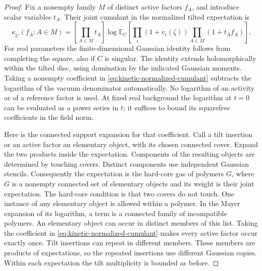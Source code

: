 \documentclass[11pt]{article}
\theoremstyle{definition}
\newcommand{\E}{\mathbb E}
\begin{document}
\begin{proof}
Fix a nonempty family \(M\) of distinct active factors
\(f_A\), and introduce scalar variables \(t_A\). Their joint
cumulant in the normalized tilted expectation is
\begin{equation}
 \kappa_{\widetilde C}(f_A:A\in M)
   =\left[\prod_{A\in M}t_A\right]
       \log\E_C\left[
         \prod_i(1+v_i(\zeta))
         \prod_{A\in M}(1+t_A f_A)
       \right].
 \label{eq:kinetic-normalized-cumulant}
\end{equation}
For real parameters the finite-dimensional Gaussian
identity follows from completing the square, also if
\(C\) is singular. The identity extends holomorphically
within the tilted disc, using domination by the indicated
Gaussian moments. Taking a nonempty coefficient in
\eqref{eq:kinetic-normalized-cumulant} subtracts the
logarithm of the vacuum denominator automatically.
No logarithm of an activity or of a reference factor is
used. At fixed real background the logarithm at \(t=0\)
can be evaluated as a power series in \(t\); it suffices
to bound its squarefree coefficients in the field norm.

Here is the connected support expansion for that coefficient.
Call a tilt insertion or an active factor an elementary
object, with its chosen connected cover. Expand the two
products inside the expectation. Components of the resulting
objects are determined by touching covers. Distinct
components use independent Gaussian stencils. Consequently
the expectation is the hard-core gas of polymers \(G\),
where \(G\) is a nonempty connected set of elementary objects
and its weight is their joint expectation. The hard-core
condition is that two covers do not touch. One instance
of any elementary object is allowed within a polymer.
In the Mayer expansion of its logarithm, a term is a
connected family of incompatible polymers. An elementary
object can occur in distinct members of this list. Taking
the coefficient in \eqref{eq:kinetic-normalized-cumulant}
makes every active factor occur exactly once. Tilt
insertions can repeat in different members. These members
are products of expectations, so the repeated insertions
use different Gaussian copies. Within each expectation
the tilt multiplicity is bounded as before.


\end{proof}
\end{document}
